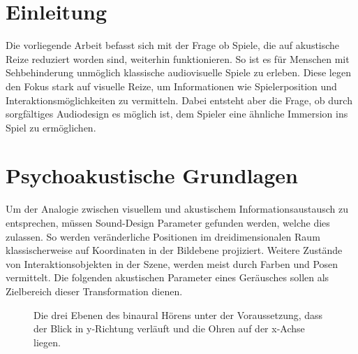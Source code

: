\documentclass[a4paper, 11pt]{scrartcl}
\begin{document}
\section{Einleitung}
\label{sec:einleitung}

Die vorliegende Arbeit befasst sich mit der Frage ob Spiele, die auf akustische
Reize reduziert worden sind, weiterhin funktionieren. So ist es für Menschen mit
Sehbehinderung unmöglich klassische audiovisuelle Spiele zu erleben. Diese legen
den Fokus stark auf visuelle Reize, um Informationen wie Spielerposition und
Interaktionsmöglichkeiten zu vermitteln. Dabei entsteht aber die Frage, ob durch
sorgfältiges Audiodesign es möglich ist, dem Spieler eine ähnliche Immersion ins
Spiel zu ermöglichen.

\section{Psychoakustische Grundlagen}
\label{sec:psychoakustische_grundlagen}

Um der Analogie zwischen visuellem und akustischem Informationsaustausch zu
entsprechen, müssen Sound-Design Parameter gefunden werden, welche dies
zulassen. So werden veränderliche Positionen im dreidimensionalen Raum
klassischerweise auf Koordinaten in der Bildebene projiziert. Weitere Zustände
von Interaktionsobjekten in der Szene, werden meist durch Farben und Posen
vermittelt. Die folgenden akustischen Parameter eines Geräusches sollen als
Zielbereich dieser Transformation dienen.

\begin{figure}
\centering


\caption{Die drei Ebenen des binaural Hörens unter der Voraussetzung, dass der 
Blick in y-Richtung verläuft und die Ohren auf der x-Achse liegen.}

\label{fig:spatilisation}
\end{figure}
\end{document}
